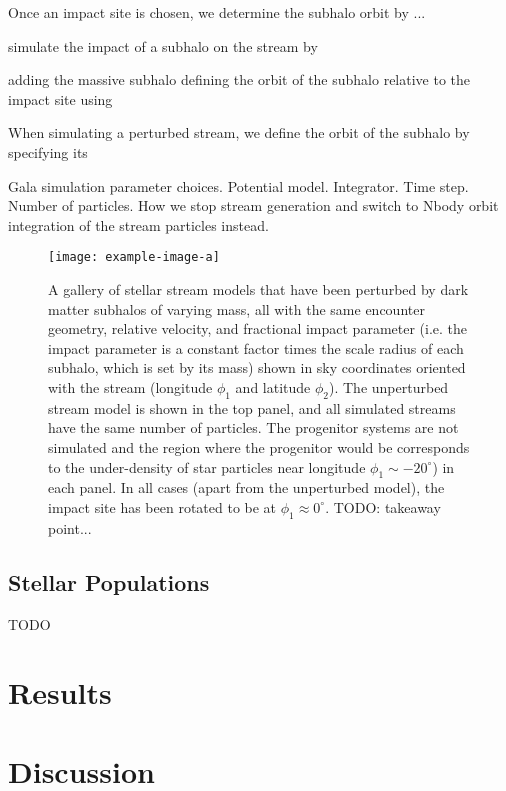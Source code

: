 Once an impact site is chosen, we determine the subhalo orbit by ...

simulate the impact of a subhalo on the stream by

adding the massive subhalo  defining the orbit of the subhalo relative to the impact site using

When simulating a perturbed stream, we define the orbit of the subhalo by specifying its

Gala simulation parameter choices. Potential model. Integrator. Time step. Number of particles. How we stop stream generation and switch to Nbody orbit integration of the stream particles instead.

\begin{figure*}[!th]
\begin{center}
\texttt{[image: example-image-a]} %
\end{center}
\caption{%
A gallery of stellar stream models that have been perturbed by dark matter subhalos of
varying mass, all with the same encounter geometry, relative velocity, and fractional
impact parameter (i.e. the impact parameter is a constant factor times the scale radius
of each subhalo, which is set by its mass) shown in sky coordinates oriented with the
stream (longitude $\phi_1$ and latitude $\phi_2$).
The unperturbed stream model is shown in the top panel, and all simulated streams have
the same number of particles.
The progenitor systems are not simulated and the region where the progenitor would be
corresponds to the under-density of star particles near longitude $\phi_1 \sim
-20^\circ$) in each panel.
In all cases (apart from the unperturbed model), the impact site has been rotated to be
at $\phi_1 \approx 0^\circ$.
TODO: takeaway point...
\label{fig:simgallery}
}
\end{figure*}

\subsection{Stellar Populations} \label{sec:stellarpops}

TODO

\section{Results} \label{sec:results}


\section{Discussion} \label{sec:discussion}


